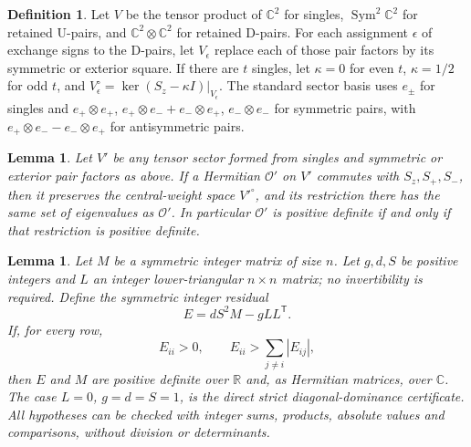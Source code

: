 \documentclass[11pt,reqno]{amsart}
\newtheorem{lemma}[theorem]{Lemma}
\theoremstyle{definition}
\newtheorem{definition}[theorem]{Definition}
\theoremstyle{remark}
\begin{document}
\begin{definition}\label{d:exchange}
Let \(V\) be the tensor product of \(\mathbb C^2\) for singles,
\(\operatorname{Sym}^2\mathbb C^2\) for retained \(\mathrm U\)-pairs,
and \(\mathbb C^2\otimes\mathbb C^2\) for retained \(\mathrm D\)-pairs.
For each assignment \(\epsilon\) of exchange signs to the
\(\mathrm D\)-pairs, let \(V_\epsilon\) replace each of those
pair factors by its symmetric or exterior square.
If there are \(t\) singles, let \(\kappa=0\) for even \(t\),
\(\kappa=1/2\) for odd \(t\), and
\(V_\epsilon^\circ=\ker(S_z-\kappa I)|_{V_\epsilon}\).
The standard sector basis uses \(e_\pm\) for singles and
\(e_+\otimes e_+\), \(e_+\otimes e_-+e_-\otimes e_+\),
\(e_-\otimes e_-\) for symmetric pairs, with
\(e_+\otimes e_--e_-\otimes e_+\) for antisymmetric pairs.
\end{definition}

\begin{lemma}\label{l:sector}
Let \(V'\) be any tensor sector formed from singles and
symmetric or exterior pair factors as above.
If a Hermitian \(\mathcal O'\) on \(V'\) commutes with
\(S_z,S_+,S_-\), then it preserves the central-weight space
\(V'^\circ\), and its restriction there has the same set of
eigenvalues as \(\mathcal O'\).
In particular \(\mathcal O'\) is positive definite if and only if
that restriction is positive definite.
\end{lemma}

\begin{lemma}\label{l:gram-residual}
Let \(M\) be a symmetric integer matrix of size \(n\).
Let \(g,d,S\) be positive integers and \(L\) an integer
lower-triangular \(n\times n\) matrix; no invertibility is required.
Define the symmetric integer residual
\[
 E=dS^2M-gLL^{\mathsf T}.
\]
If, for every row,
\[
 E_{ii}>0,\qquad E_{ii}>\sum_{j\ne i}|E_{ij}|,
\]
then \(E\) and \(M\) are positive definite over \(\mathbb R\)
and, as Hermitian matrices, over \(\mathbb C\).
The case \(L=0\), \(g=d=S=1\), is the direct strict
diagonal-dominance certificate.
All hypotheses can be checked with integer sums, products,
absolute values and comparisons, without division or determinants.
\end{lemma}
\end{document}
